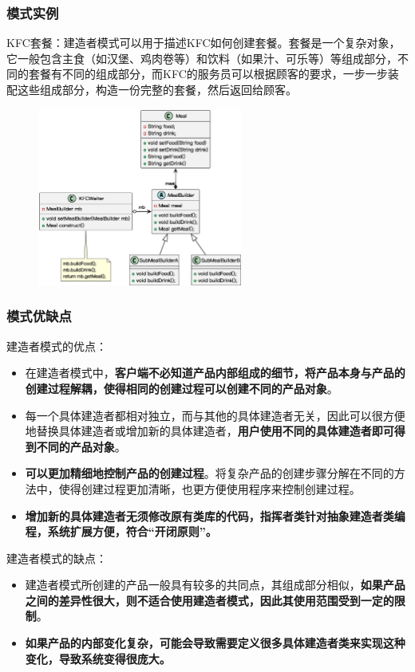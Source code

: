 \subsubsection{模式实例}
KFC套餐：建造者模式可以用于描述KFC如何创建套餐。套餐是一个复杂对象，它一般包含主食（如汉堡、鸡肉卷等）和饮料（如果汁、可乐等）等组成部分，不同的套餐有不同的组成部分，而KFC的服务员可以根据顾客的要求，一步一步装配这些组成部分，构造一份完整的套餐，然后返回给顾客。
\begin{figure}[H]
    \vspace{-0.5em}
	\centering
	\includegraphics[width=0.6\textwidth]{images/建造者模式实例.eps}
    \vspace{-1em}
\end{figure}

\subsubsection{模式优缺点}
建造者模式的优点：
\begin{itemize}
    \item 在建造者模式中，\textbf{客户端不必知道产品内部组成的细节，将产品本身与产品的创建过程解耦，使得相同的创建过程可以创建不同的产品对象}。
    \item 每一个具体建造者都相对独立，而与其他的具体建造者无关，因此可以很方便地替换具体建造者或增加新的具体建造者，\textbf{用户使用不同的具体建造者即可得到不同的产品对象}。
    \item \textbf{可以更加精细地控制产品的创建过程}。将复杂产品的创建步骤分解在不同的方法中，使得创建过程更加清晰，也更方便使用程序来控制创建过程。
    \item \textbf{增加新的具体建造者无须修改原有类库的代码，指挥者类针对抽象建造者类编程，系统扩展方便，符合“开闭原则”。}
\end{itemize}

建造者模式的缺点：
\begin{itemize}
    \item 建造者模式所创建的产品一般具有较多的共同点，其组成部分相似，\textbf{如果产品之间的差异性很大，则不适合使用建造者模式，因此其使用范围受到一定的限制}。
    \item \textbf{如果产品的内部变化复杂，可能会导致需要定义很多具体建造者类来实现这种变化，导致系统变得很庞大。}
\end{itemize}


